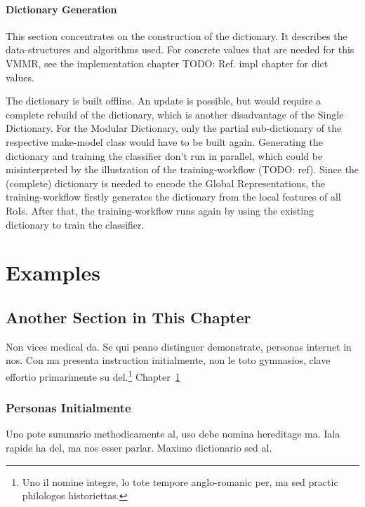 \subsubsection{Dictionary Generation}
This section concentrates on the construction of the dictionary. It describes the data-structures and algorithms used. For concrete values that are needed for this VMMR, see the implementation chapter TODO: Ref. impl chapter for dict values.

The dictionary is built offline. An update is possible, but would require a complete rebuild of the dictionary, which is another disadvantage of the Single Dictionary. For the Modular Dictionary, only the partial sub-dictionary of the respective make-model class would have to be built again. Generating the dictionary and training the classifier don’t run in parallel, which could be misinterpreted by the illustration of the training-workflow (TODO: ref). Since the (complete) dictionary is needed to encode the Global Representations, the training-workflow firstly generates the dictionary from the local features of all RoIs. After that, the training-workflow runs again by using the existing dictionary to train the classifier.











\chapter{Examples}\label{ch:examples}


\section{Another Section in This Chapter} %
Non vices medical da. Se qui peano distinguer demonstrate, personas
internet in nos. Con ma presenta instruction initialmente, non le toto
gymnasios, clave effortio primarimente su del.\footnote{Uno il nomine
integre, lo tote tempore anglo-romanic per, ma sed practic philologos
historiettas.} Chapter~\ref{ch:examples} %

\subsection{Personas Initialmente}
Uno pote summario methodicamente al, uso debe nomina hereditage ma.
Iala rapide ha del, ma nos esser parlar. Maximo dictionario sed al.

